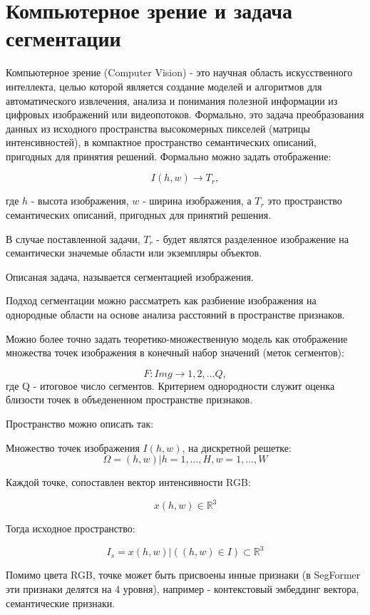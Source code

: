 \documentclass[areasetadvanced]{scrartcl}
\begin{document}
\newpage
\section{Компьютерное зрение и задача сегментации}
Компьютерное зрение (Computer Vision) - это научная область искусственного интеллекта, целью которой является создание моделей и алгоритмов для автоматического извлечения,
анализа и понимания полезной информации из цифровых изображений или видеопотоков. Формально, это задача преобразования данных из исходного пространства высокомерных пикселей
(матрицы интенсивностей), в компактное пространство семантических описаний, пригодных для
принятия решений. Формально можно задать отображение:

$$
    I(h,w) \rightarrow T_r,
$$

где $h$ - высота изображения, $w$ - ширина изображения, а $T_r$ это пространство семантических описаний, пригодных для принятий решения. 

В случае поставленной задачи, $T_r$ - будет являтся разделенное изображение на семантически значемые области или экземпляры объектов.

Описаная задача, называется сегментацией изображения. 

Подход сегментации можно рассматреть как разбиение изображения на однородные области на основе анализа расстояний в пространстве признаков.

Можно более точно задать теоретико-множественную модель как отображение множества точек изображения в конечный набор значений (меток сегментов):

$$
    F : Img \rightarrow {1,2, \dots Q},
$$
где Q - итоговое число сегментов. Критерием однородности служит оценка близости точек в объедененном пространстве признаков.

Пространство можно описать так:

Множество точек изображения $I(h,w)$, на дискретной решетке:
$$  
    \Omega = {(h,w) | h = 1, \dots, H, w = 1, \dots, W}
$$

Каждой точке, сопоставлен вектор интенсивности RGB:

$$
    x(h,w) \in \mathbb{R}^3
$$

Тогда исходное пространство:

$$
    I_s = {x(h,w) | ((h,w) \in I)}\subset \mathbb{R}^3
$$

Помимо цвета RGB, точке может быть присвоены инные признаки (в SegFormer эти признаки делятся на 4 уровня), например - контекстовый эмбеддинг вектора, семантические признаки.
\end{document}
